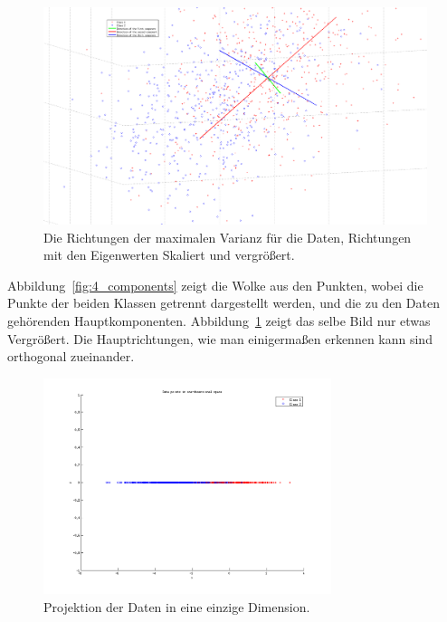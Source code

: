 \begin{figure}[h!]
  \begin{center}
    \includegraphics[width=1\textwidth]{./figures/4_Components_zoom}
    \caption{Die Richtungen der maximalen Varianz für die Daten, Richtungen mit den Eigenwerten Skaliert und vergrößert.}
    \label{fig:4_components_zoom}
  \end{center}
\end{figure}
Abbildung~\ref{fig:4_components} zeigt die Wolke aus den Punkten, wobei die Punkte der beiden Klassen getrennt dargestellt werden, und die zu den Daten gehörenden Hauptkomponenten.
Abbildung~\ref{fig:4_components_zoom} zeigt das selbe Bild nur etwas Vergrößert. Die Hauptrichtungen, wie man einigermaßen erkennen kann sind orthogonal zueinander.\newline
 
\begin{figure}[h!]
  \begin{center}
    \includegraphics[width=0.75\textwidth]{./figures/4_one_dim}
    \caption{Projektion der Daten in eine einzige Dimension.}
    \label{fig:4_one_dim}
  \end{center}
\end{figure}

